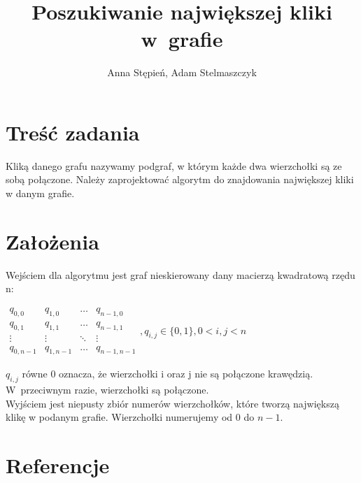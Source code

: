 \documentclass[12pt, a4paper]{article}
\title{\textbf{Poszukiwanie największej kliki w~grafie}}
\author{Anna Stępień, Adam Stelmaszczyk}
\date{}
\begin{document}
\maketitle
\setlength{\parindent}{0in}
\section{Treść zadania}

Kliką danego grafu nazywamy podgraf, w którym każde dwa wierzchołki są ze sobą połączone. 
Należy zaprojektować algorytm do znajdowania największej kliki w danym grafie.

\section{Założenia}

Wejściem dla algorytmu jest graf nieskierowany dany macierzą kwadratową rzędu n:

\vspace{1.5\baselineskip}
$ 
\begin{array}{cccc}
q_{0,0} & q_{1,0} & \ldots & q_{n-1,0} \\
q_{0,1} & q_{1,1} & \ldots & q_{n-1,1} \\
\vdots  & \vdots  & \ddots & \vdots  \\
q_{0,n-1} & q_{1,n-1} & \ldots & q_{n-1,n-1} 
\end{array}
, q_{i,j} \in \{0,1\}, 0 < i,j < n
$
\vspace{1.5\baselineskip}

$q_{i,j}$ równe 0 oznacza, że wierzchołki i oraz j nie są połączone krawędzią. W~przeciwnym razie, wierzchołki są połączone.\\

Wyjściem jest niepusty zbiór numerów wierzchołków, które tworzą największą klikę w podanym grafie.
Wierzchołki numerujemy od 0 do $n-1$.

\section{Referencje}
\end{document}
